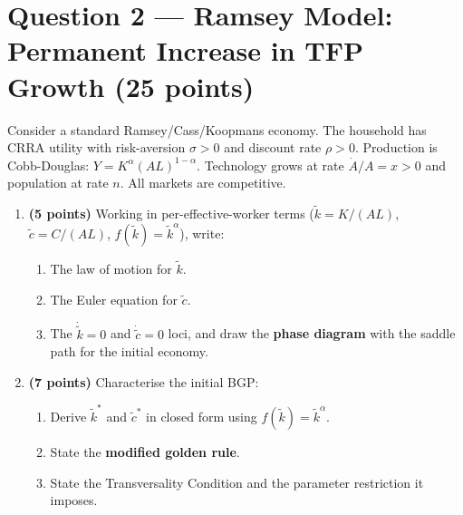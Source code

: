 \documentclass[a4paper,11pt]{article}
\newcommand{\ktilde}{\tilde{k}}
\newcommand{\ctilde}{\tilde{c}}
\begin{document}
\clearpage

\section{Question 2 --- Ramsey Model: Permanent Increase in TFP Growth
\hfill (25 points)}

Consider a standard Ramsey/Cass/Koopmans economy.  The household has CRRA utility with
risk-aversion $\sigma > 0$ and discount rate $\rho > 0$.  Production is Cobb-Douglas:
$Y = K^{\alpha}(AL)^{1-\alpha}$.  Technology grows at rate $\dot{A}/A = x > 0$ and
population at rate $n$.  All markets are competitive.

\begin{enumerate}[label=\textbf{\arabic*.}, leftmargin=*, itemsep=6pt]

    \item \textbf{(5 points)}
    Working in per-effective-worker terms ($\ktilde = K/(AL)$,
    $\ctilde = C/(AL)$, $f(\ktilde) = \ktilde^{\alpha}$), write:
    \begin{enumerate}[label=(\alph*), itemsep=4pt]
        \item The law of motion for $\ktilde$.
        \item The Euler equation for $\ctilde$.
        \item The $\dot{\ktilde}=0$ and $\dot{\ctilde}=0$ loci, and draw the
        \textbf{phase diagram} with the saddle path for the initial economy.
    \end{enumerate}

    \item \textbf{(7 points)}
    Characterise the initial BGP:
    \begin{enumerate}[label=(\alph*), itemsep=4pt]
        \item Derive $\ktilde^*$ and $\ctilde^*$ in closed form using
        $f(\ktilde)=\ktilde^{\alpha}$.
        \item State the \textbf{modified golden rule}.
        \item State the Transversality Condition and the parameter restriction it
        imposes.
    \end{enumerate}


\end{enumerate}
\end{document}
